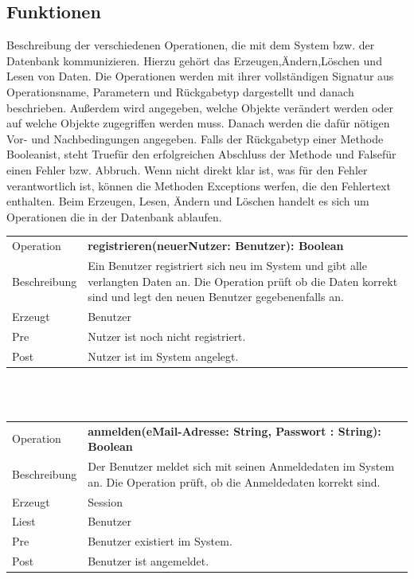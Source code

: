 \documentclass[12pt,a4paper]{article}
\begin{document}
{\subsection{Funktionen}
Beschreibung der verschiedenen Operationen, die mit dem System bzw. der Datenbank kommunizieren. Hierzu gehört das Erzeugen,Ändern,Löschen und Lesen von Daten. Die Operationen werden mit ihrer vollständigen Signatur aus Operationsname, Parametern und Rückgabetyp dargestellt und danach beschrieben. Außerdem wird angegeben, welche Objekte verändert werden oder auf welche Objekte zugegriffen werden muss. Danach werden die dafür nötigen Vor- und Nachbedingungen angegeben. Falls der Rückgabetyp einer Methode \glqq Boolean\grqq ist, steht \glqq True\grqq für den erfolgreichen Abschluss der Methode und \glqq False\grqq für einen Fehler bzw. Abbruch. Wenn nicht direkt klar ist, was für den Fehler verantwortlich ist, können die Methoden Exceptions werfen, die den Fehlertext enthalten. Beim Erzeugen, Lesen, Ändern und Löschen handelt es sich um Operationen die in der Datenbank ablaufen.
\newline

\begin{tabular}{|l|p{12cm}|}
	\hline
	Operation &  \textbf{registrieren(neuerNutzer: Benutzer): Boolean }\\ 
	Beschreibung & Ein Benutzer registriert sich neu im System und gibt alle verlangten Daten an. Die Operation prüft ob die Daten korrekt sind und legt den neuen Benutzer gegebenenfalls an.\\ 
	Erzeugt &  Benutzer\\ 
	Pre &  Nutzer ist noch nicht registriert. \\ 
	Post & Nutzer ist im System angelegt.  \\ 
	\hline 
\end{tabular} \\\\

\begin{tabular}{|l|p{12cm}|}
	\hline
	Operation &  \textbf{anmelden(eMail-Adresse: String, Passwort : String): Boolean} \\ 
	Beschreibung &  Der Benutzer meldet sich mit seinen Anmeldedaten im System an. Die Operation prüft, ob die Anmeldedaten korrekt sind.\\ 
	Erzeugt & Session \\ 
	Liest & Benutzer \\ 
	Pre & Benutzer existiert im System. \\ 
	Post & Benutzer ist angemeldet. \\ 
	\hline 
\end{tabular} \\\\

}
\end{document}
